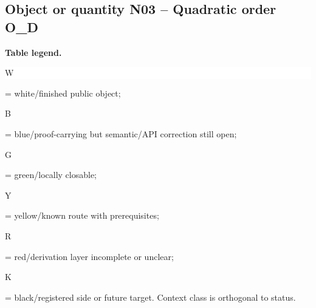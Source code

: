 \subsection*{Object or quantity N03 -- Quadratic order O\_D}
\hypertarget{objproof:N03}{}
\par\smallskip\noindent\begin{minipage}{0.99\linewidth}\footnotesize\raggedright\textbf{Table legend.} \colorbox{white}{\strut W} = white/finished public object; \colorbox{cyan!20}{\strut B} = blue/proof-carrying but semantic/API correction still open; \colorbox{green!18}{\strut G} = green/locally closable; \colorbox{yellow!25}{\strut Y} = yellow/known route with prerequisites; \colorbox{red!20}{\strut R} = red/derivation layer incomplete or unclear; \colorbox{black!18}{\strut K} = black/registered side or future target. Context class is orthogonal to status.\end{minipage}\par\vspace{0.25em}
